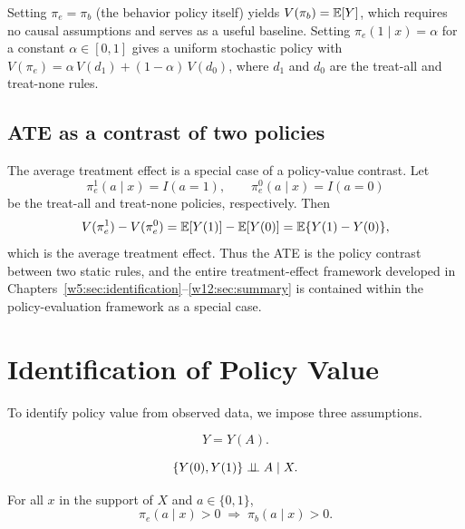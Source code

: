 \documentclass[master.tex]{subfiles}
\begin{document}
\begin{remark}
Setting $\pi_e=\pi_b$ (the behavior policy itself) yields $V(\pi_b)=\mathbb{E}[Y]$, which requires no causal assumptions and serves as a useful baseline.  Setting $\pi_e(1\mid x)=\alpha$ for a constant $\alpha\in[0,1]$ gives a uniform stochastic policy with $V(\pi_e)=\alpha\,V(d_1)+(1-\alpha)\,V(d_0)$, where $d_1$ and $d_0$ are the treat-all and treat-none rules.
\end{remark}

\subsection{ATE as a contrast of two policies}
\label{w13:subsec:ate-contrast}

The average treatment effect is a special case of a policy-value contrast.  Let
\[
\pi_e^1(a\mid x)=I(a=1), \qquad \pi_e^0(a\mid x)=I(a=0)
\]
be the treat-all and treat-none policies, respectively.  Then
\[
V(\pi_e^1)-V(\pi_e^0)
= \mathbb{E}[Y(1)] - \mathbb{E}[Y(0)]
= \mathbb{E}\{Y(1)-Y(0)\},
\]
which is the average treatment effect.  Thus the ATE is the policy contrast between two static rules, and the entire treatment-effect framework developed in Chapters~\ref{w5:sec:identification}--\ref{w12:sec:summary} is contained within the policy-evaluation framework as a special case.

\section{Identification of Policy Value}
\label{w13:sec:identification}

To identify policy value from observed data, we impose three assumptions.

\begin{tcolorbox}[defstyle, title={Assumption (Consistency)}]
\label{w13:asm:consistency}
\[
Y=Y(A).
\]
\end{tcolorbox}

\begin{tcolorbox}[defstyle, title={Assumption (Ignorability)}]
\label{w13:asm:ignorability}
\[
\{Y(0),Y(1)\}\perp\!\!\!\perp A \mid X.
\]
\end{tcolorbox}

\begin{tcolorbox}[defstyle, title={Assumption (Support condition)}]
\label{w13:asm:positivity}
For all $x$ in the support of $X$ and $a\in\{0,1\}$,
\[
\pi_e(a\mid x)>0
\;\Longrightarrow\;
\pi_b(a\mid x)>0.
\]
\end{tcolorbox}
\end{document}
